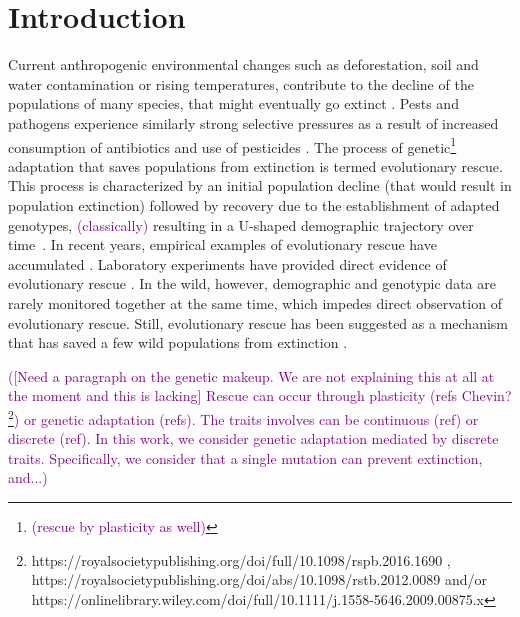 \documentclass[11pt]{article}
\newcommand{\florence}[1]{\textcolor{purple}{(#1)}} %
\newcommand{\chg}[1]{\textcolor{change}{#1}}
\begin{document}

\newpage

\section*{Introduction}

Current anthropogenic environmental changes such as deforestation, soil and water contamination or rising temperatures, contribute to the decline of the populations of many species, that might eventually go extinct \citep{bellard_2012, diniz_2019}. Pests and pathogens experience similarly strong selective pressures as a result of increased consumption of antibiotics and use of pesticides \citep{ramsayer_2013, kreiner_2018}. 
The process of genetic\footnote{\florence{rescue by plasticity as well}} adaptation that saves populations from extinction is termed evolutionary rescue. This \chg{process is characterized by an initial population decline (that would result in population extinction) followed by recovery due to the establishment of adapted genotypes, } \florence{classically} resulting in a U-shaped demographic trajectory over time~\citep{gomulkiewicz_1995}.
In recent years, empirical examples of evolutionary rescue have accumulated \citep[as reviewed by ][]{alexander_2014,carlson_2014,bell_2017}. Laboratory experiments have provided direct evidence of evolutionary rescue  \citep[e.g.][]{bell_2009, agashe_2011, lachapelle_2012, lindsey_2013, stelkens_2014}. In the wild, however, demographic and genotypic data are rarely monitored together at the same time, which impedes direct observation of evolutionary rescue. Still, evolutionary rescue has been suggested as a mechanism that has saved a few wild populations from extinction \citep[e.g.][]{vanderwal_2012, digiallonardo_2015, gignoux_2018}. 



\florence{[Need a paragraph on the genetic makeup. We are not explaining this at all at the moment and this is lacking] Rescue can occur through plasticity (refs Chevin? \footnote{https://royalsocietypublishing.org/doi/full/10.1098/rspb.2016.1690 , https://royalsocietypublishing.org/doi/abs/10.1098/rstb.2012.0089 and/or https://onlinelibrary.wiley.com/doi/full/10.1111/j.1558-5646.2009.00875.x}) or genetic adaptation (refs). The traits involves can be continuous (ref) or discrete (ref). In this work, we consider genetic adaptation mediated by discrete traits. Specifically, we consider that a single mutation can prevent extinction, and...}
\end{document}
